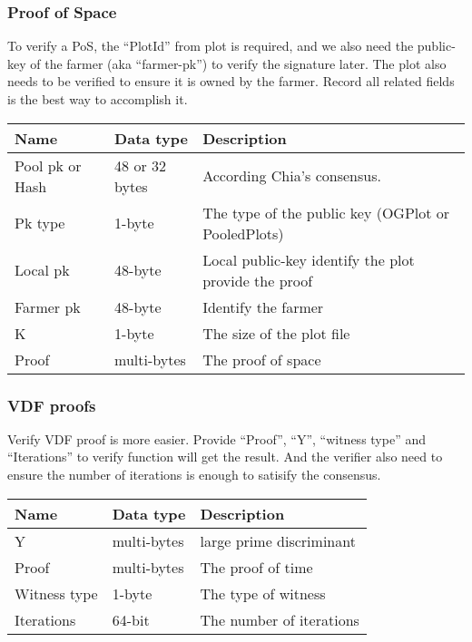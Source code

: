 \subsubsection{Proof of Space}
\begin{flushleft}
    To verify a PoS, the ``PlotId'' from plot is required, and we also need the public-key of the farmer (aka ``farmer-pk'') to verify the signature later. The plot also needs to be verified to ensure it is owned by the farmer. Record all related fields is the best way to accomplish it.
\end{flushleft}
\begin{tabular}{ |p{3cm}|p{3cm}|p{6cm}| }
    \hline
    \rowcolor{lightgray}\textbf{Name} & \textbf{Data type} & \textbf{Description} \\[5pt]
    \hline
    Pool pk or Hash & 48 or 32 bytes & According Chia's consensus.\\[5pt]
    \rowcolor{lightgray!30} Pk type & 1-byte & The type of the public key (OGPlot or PooledPlots) \\[5pt]
    Local pk & 48-byte & Local public-key identify the plot provide the proof \\[5pt]
    \rowcolor{lightgray!30} Farmer pk & 48-byte & Identify the farmer \\[5pt]
    K & 1-byte & The size of the plot file \\[5pt]
    \rowcolor{lightgray!30} Proof & multi-bytes & The proof of space \\[5pt]
    \hline
\end{tabular}
\subsubsection{VDF proofs}
\begin{flushleft}
    Verify VDF proof is more easier. Provide ``Proof'', ``Y'', ``witness type'' and ``Iterations'' to verify function will get the result. And the verifier also need to ensure the number of iterations is enough to satisify the consensus.
\end{flushleft}
\begin{tabular}{ |p{3cm}|p{3cm}|p{6cm}| }
    \hline
    \rowcolor{lightgray}\textbf{Name} & \textbf{Data type} & \textbf{Description} \\[5pt]
    \hline
    Y & multi-bytes & large prime discriminant \\[5pt]
    \rowcolor{lightgray!30} Proof & multi-bytes & The proof of time \\[5pt]
    Witness type & 1-byte & The type of witness \\[5pt]
    \rowcolor{lightgray!30} Iterations & 64-bit & The number of iterations \\[5pt]
    \hline
\end{tabular}

